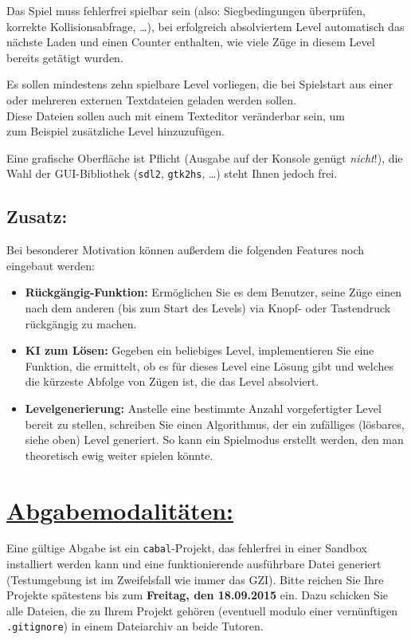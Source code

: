 \documentclass[10pt,a4paper]{article}
\begin{document}
Das Spiel muss fehlerfrei spielbar sein (also: Siegbedingungen überprüfen, korrekte Kollisionsabfrage, \dots), bei erfolgreich absolviertem Level automatisch das nächste Laden und einen Counter enthalten, wie viele Züge in diesem Level bereits getätigt wurden.\bigskip

Es sollen mindestens zehn spielbare Level vorliegen, die bei Spielstart aus einer oder mehreren externen Textdateien geladen werden sollen.\\
Diese Dateien sollen auch mit einem Texteditor veränderbar sein, um\\ zum Beispiel zusätzliche Level hinzuzufügen.\bigskip
 
Eine grafische Oberfläche ist Pflicht (Ausgabe auf der Konsole  genügt \emph{nicht}!), die Wahl der GUI-Bibliothek (\texttt{sdl2}, \texttt{gtk2hs}, \dots) steht Ihnen jedoch frei. 

\subsection*{Zusatz:}

Bei besonderer Motivation können außerdem die folgenden Features noch eingebaut werden:
 
\begin{itemize}
\item \textbf{Rückgängig-Funktion:} Ermöglichen Sie es dem Benutzer, seine Züge einen nach dem anderen (bis zum Start des Levels) via Knopf- oder Tastendruck rückgängig zu machen.

\item \textbf{KI zum Lösen:} Gegeben ein beliebiges Level, implementieren Sie eine Funktion, die ermittelt, ob es für dieses Level eine Lösung gibt und welches die kürzeste Abfolge von Zügen ist, die das Level absolviert.

\item \textbf{Levelgenerierung:} Anstelle eine bestimmte Anzahl vorgefertigter Level bereit zu stellen, schreiben Sie einen Algorithmus, der ein zufälliges (lösbares, siehe oben) Level generiert. So kann ein Spielmodus erstellt werden, den man theoretisch ewig weiter spielen könnte.
\end{itemize}

\section*{\underline{Abgabemodalitäten:}}

Eine gültige Abgabe ist ein \texttt{cabal}-Projekt, das fehlerfrei in einer Sandbox installiert werden kann und eine funktionierende ausführbare Datei generiert (Testumgebung ist im Zweifelsfall wie immer das GZI). Bitte reichen Sie Ihre Projekte spätestens bis zum \textbf{Freitag, den 18.09.2015} ein.
Dazu schicken Sie alle Dateien, die zu Ihrem Projekt gehören (eventuell modulo einer vernünftigen \texttt{.gitignore}) in einem Dateiarchiv an beide Tutoren.\bigskip
\end{document}
